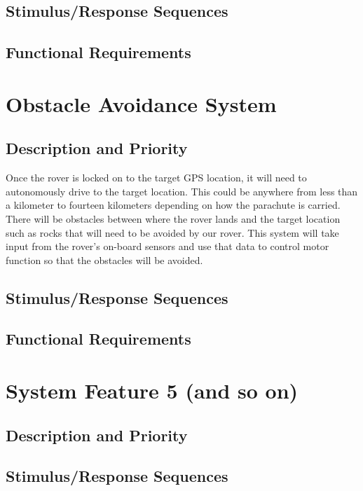 \documentclass{scrreprt}
\begin{document}
\subsection{Stimulus/Response Sequences}


\subsection{Functional Requirements}

\section{Obstacle Avoidance System}

\subsection{Description and Priority}
	Once the rover is locked on to the target GPS location, it will need to autonomously drive to the target location. This could be anywhere from less than a kilometer to fourteen kilometers depending on how the parachute is carried. There will be obstacles between where the rover lands and the target location such as rocks that will need to be avoided by our rover. This system will take input from the rover's on-board sensors and use that data to control motor function so that the obstacles will be avoided.


\subsection{Stimulus/Response Sequences}


\subsection{Functional Requirements}

\section{System Feature 5 (and so on)}

\subsection{Description and Priority}



\subsection{Stimulus/Response Sequences}
\end{document}
